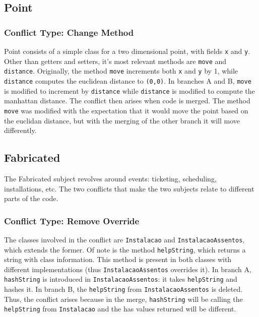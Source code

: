
\subsection{Point}

\subsubsection{Conflict Type: Change Method}

Point consists of a simple class for a two dimensional point, with fields \texttt{x} and \texttt{y}.
Other than getters and setters, it's most relevant methods are \texttt{move} and \texttt{distance}.
Originally, the method \texttt{move} increments both \texttt{x} and \texttt{y} by 1, while \texttt{distance} computes the euclidean distance to \texttt{(0,0)}.
In branches A and B, \texttt{move} is modified to increment by \texttt{distance} while \texttt{distance} is modified to compute
the manhattan distance.  The conflict then arises when code is merged. The method \texttt{move} was modified with the expectation that it would move
the point based on the euclidan distance, but with the merging of the other branch it will move differently.

\subsection{Fabricated}

The Fabricated subject revolves around events: ticketing, scheduling, installations, etc. The two
conflicts that make the two subjects relate to different parts of the code.

\subsubsection{Conflict Type: Remove Override}

The classes involved in the conflict are \texttt{Instalacao} and \texttt{InstalacaoAssentos}, which extends the former.
Of note is the method \texttt{helpString}, which returns a string with class information.  This method is present
in both classes with different implementations (thus \texttt{InstalacaoAssentos} overrides it). In branch A,
\texttt{hashString} is introduced in \texttt{InstalacaoAssentos}: it takes \texttt{helpString} and hashes it. In branch B,
the \texttt{helpString} from \texttt{InstalacaoAssentos} is deleted. Thus, the conflict arises because in the merge,
\texttt{hashString} will be calling the \texttt{helpString} from \texttt{Instalacao} and the has values returned will be different.

